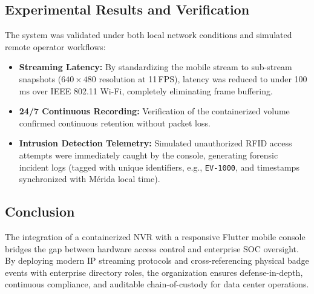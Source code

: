 \subsection{Experimental Results and Verification}
The system was validated under both local network conditions and simulated remote operator workflows:
\begin{itemize}
    \item \textbf{Streaming Latency:} By standardizing the mobile stream to sub-stream snapshots ($640 \times 480$ resolution at 11\,FPS), latency was reduced to under 100\,ms over IEEE 802.11 Wi-Fi, completely eliminating frame buffering.
    \item \textbf{24/7 Continuous Recording:} Verification of the containerized volume confirmed continuous retention without packet loss.
    \item \textbf{Intrusion Detection Telemetry:} Simulated unauthorized RFID access attempts were immediately caught by the console, generating forensic incident logs (tagged with unique identifiers, e.g., \texttt{EV-1000}, and timestamps synchronized with Mérida local time).
\end{itemize}

\subsection{Conclusion}
The integration of a containerized NVR with a responsive Flutter mobile console bridges the gap between hardware access control and enterprise SOC oversight. By deploying modern IP streaming protocols and cross-referencing physical badge events with enterprise directory roles, the organization ensures defense-in-depth, continuous compliance, and auditable chain-of-custody for data center operations.
